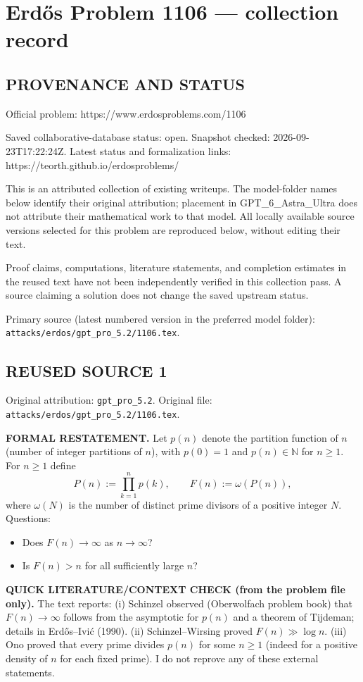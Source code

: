 \section*{Erd\H{o}s Problem 1106 --- collection record}

\subsection*{PROVENANCE AND STATUS}
Official problem: https://www.erdosproblems.com/1106

Saved collaborative-database status: open.
Snapshot checked: 2026-09-23T17:22:24Z.
Latest status and formalization links: https://teorth.github.io/erdosproblems/

This is an attributed collection of existing writeups. The model-folder names below identify their original attribution; placement in GPT\_6\_Astra\_Ultra does not attribute their mathematical work to that model. All locally available source versions selected for this problem are reproduced below, without editing their text.

Proof claims, computations, literature statements, and completion estimates in the reused text have not been independently verified in this collection pass. A source claiming a solution does not change the saved upstream status.

Primary source (latest numbered version in the preferred model folder): \texttt{attacks/erdos/gpt\_pro\_5.2/1106.tex}.

\subsection*{REUSED SOURCE 1}
Original attribution: \texttt{gpt\_pro\_5.2}.
Original file: \texttt{attacks/erdos/gpt\_pro\_5.2/1106.tex}.


\noindent\textbf{FORMAL RESTATEMENT.}
Let $p(n)$ denote the partition function of $n$ (number of integer partitions of $n$), with $p(0)=1$ and $p(n)\in\mathbb N$ for $n\ge 1$.
For $n\ge 1$ define
\[P(n):=\prod_{k=1}^n p(k),\qquad F(n):=\omega(P(n)),
\]
where $\omega(N)$ is the number of distinct prime divisors of a positive integer $N$.
Questions:
\begin{itemize}
\item Does $F(n)\to\infty$ as $n\to\infty$?
\item Is $F(n)>n$ for all sufficiently large $n$?
\end{itemize}

\medskip
\noindent\textbf{QUICK LITERATURE/CONTEXT CHECK (from the problem file only).}
The text reports:
(i) Schinzel observed (Oberwolfach problem book) that $F(n)\to\infty$ follows from the asymptotic for $p(n)$ and a theorem of Tijdeman; details in Erd\H{o}s--Ivi\'{c} (1990).
(ii) Schinzel--Wirsing proved $F(n)\gg \log n$.
(iii) Ono proved that every prime divides $p(n)$ for some $n\ge 1$ (indeed for a positive density of $n$ for each fixed prime).
I do not reprove any of these external statements.

